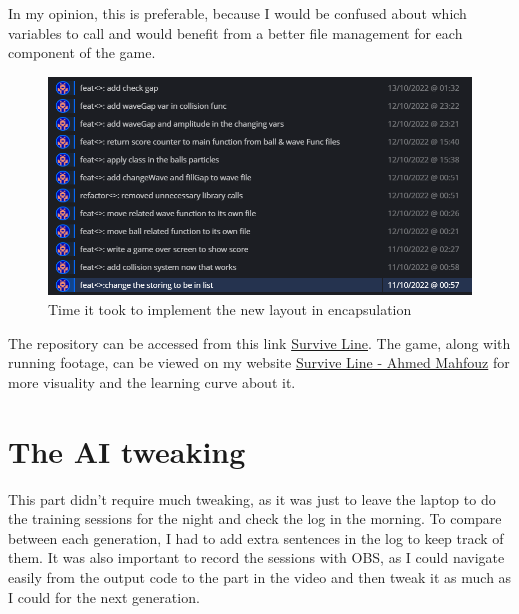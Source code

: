 In my opinion, this is preferable, because I would be confused about which variables to call and would benefit from a better file management for each component of the game.
\begin{figure}[H]
	\centering
	\includegraphics[width=0.7\linewidth]{usedImages/repoEncapsulation}
	\caption[]{Time it took to implement the new layout in encapsulation}
	\label{fig:repoencapsulation}
\end{figure}

The repository can be accessed from this link \href{https://github.com/Ahelsamahy/Survive-Line}{Survive Line}. The game, along with running footage, can be viewed on my website \href{http://ahmedmahfouz.me/?p=thesis}{Survive Line - Ahmed Mahfouz} for more visuality and the learning curve about it.

\section{The AI tweaking}

This part didn't require much tweaking, as it was just to leave the laptop to do the training sessions for the night and check the log in the morning. To compare between each generation, I had to add extra  sentences in the log to keep track of them. It was also important to record the sessions with OBS, as I could navigate easily from the output code to the part in the video and then tweak it as much as I could for the next generation.
